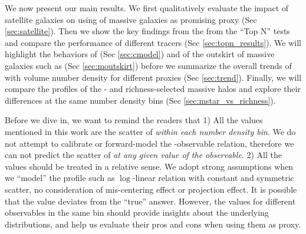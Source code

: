 \documentclass[a4paper,fleqn,usenatbib]{mnras}
\begin{document}
    We now present our main results. 
    We first qualitatively evaluate the impact of satellite galaxies on using \mstar{} of massive
    galaxies as promising \mvir{} proxy (Sec \ref{sec:satellite}).
    Then we show the key findings from the from the ``Top N'' tests and compare the performance
    of different \mvir{} tracers (Sec \ref{sec:topn_results}).
    We will highlight the behaviors of \mcmodel{} (Sec \ref{sec:cmodel}) and \mstar{}
    of the outskirt of massive galaxies such as  (Sec \ref{sec:moutskirt})
    before we summarize the overall trends of \sigmh{} with volume number density for different
    \mvir{} proxies (Sec \ref{sec:trend}).
    Finally, we will compare the \dsigma{} profiles of the \mstar{}- and richness-selected
    massive halos and explore their differences at the same number density bins
    (Sec \ref{sec:mstar_vs_richness}).

    Before we dive in, we want to remind the readers that
    1) All the \sigmh{} values mentioned in this work are the scatter of \mvir{} \emph{within each
    number density bin}. We do not attempt to calibrate or forward-model the \mvir{}-observable
    relation, therefore we can not predict the scatter of \mvir{} \emph{at any given value of
    the observable}.
    2) All the \sigmh{} values should be treated in a relative sense. We adopt strong
    assumptions when we ``model'' the \dsigma{} profile such as $\log$-linear relation with
    constant and symmetric scatter, no consideration of mis-centering effect or projection effect.
    It is possible that the \sigmh{} value deviates from the ``true'' answer.
    However, the \sigmh{} values for different observables in the same bin should provide
    insights about the underlying \mvir{} distributions, and help us evaluate their pros and cons
    when using them as \mvir{} proxy.
\end{document}
